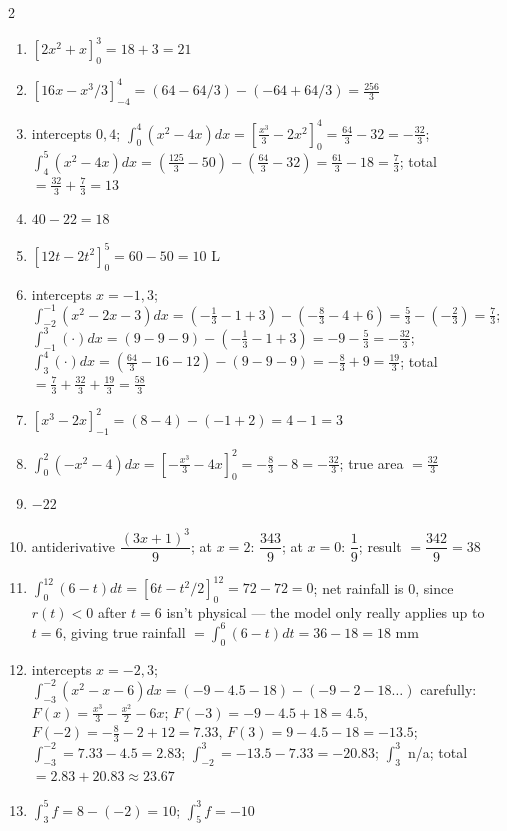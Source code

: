 \documentclass[11pt]{article}
\begin{document}
\begin{keybox}
\begin{multicols}{2}
\small
\begin{enumerate}[leftmargin=*,itemsep=3pt]
  \item $[2x^2+x]_0^3=18+3=21$
  \item $[16x-x^3/3]_{-4}^4=(64-64/3)-(-64+64/3)=\tfrac{256}3$
  \item intercepts $0,4$; $\int_0^4(x^2-4x)dx=[\tfrac{x^3}3-2x^2]_0^4=\tfrac{64}3-32=-\tfrac{32}3$; $\int_4^5(x^2-4x)dx=(\tfrac{125}3-50)-(\tfrac{64}3-32)=\tfrac{61}3-18=\tfrac73$; total $=\tfrac{32}3+\tfrac73=13$
  \item $40-22=18$
  \item $[12t-2t^2]_0^5=60-50=10$ L
  \item intercepts $x=-1,3$; $\int_{-2}^{-1}(x^2-2x-3)dx=(-\tfrac13-1+3)-(-\tfrac83-4+6)=\tfrac53-(-\tfrac23)=\tfrac73$; $\int_{-1}^3(\cdot)dx=(9-9-9)-(-\tfrac13-1+3)=-9-\tfrac53=-\tfrac{32}3$; $\int_3^4(\cdot)dx=(\tfrac{64}3-16-12)-(9-9-9)=-\tfrac83+9=\tfrac{19}3$; total $=\tfrac73+\tfrac{32}3+\tfrac{19}3=\tfrac{58}3$
  \item $[x^3-2x]_{-1}^2=(8-4)-(-1+2)=4-1=3$
  \item $\int_0^2(-x^2-4)dx=[-\tfrac{x^3}3-4x]_0^2=-\tfrac83-8=-\tfrac{32}3$; true area $=\tfrac{32}3$
  \item $-22$
  \item antiderivative $\dfrac{(3x+1)^3}9$; at $x=2$: $\dfrac{343}9$; at $x=0$: $\dfrac19$; result $=\dfrac{342}9=38$
  \item $\int_0^{12}(6-t)dt=[6t-t^2/2]_0^{12}=72-72=0$; net rainfall is 0, since $r(t)<0$ after $t=6$ isn't physical --- the model only really applies up to $t=6$, giving true rainfall $=\int_0^6(6-t)dt=36-18=18$ mm
  \item intercepts $x=-2,3$; $\int_{-3}^{-2}(x^2-x-6)dx=(-9-4.5-18)-(-9-2-18\ldots)$ carefully: $F(x)=\tfrac{x^3}3-\tfrac{x^2}2-6x$; $F(-3)=-9-4.5+18=4.5$, $F(-2)=-\tfrac83-2+12=7.33$, $F(3)=9-4.5-18=-13.5$; $\int_{-3}^{-2}=7.33-4.5=2.83$; $\int_{-2}^3=-13.5-7.33=-20.83$; $\int_3^3$ n/a; total $=2.83+20.83\approx23.67$
  \item $\int_3^5f=8-(-2)=10$; $\int_5^3f=-10$
\end{enumerate}
\end{multicols}
\end{keybox}
\end{document}
